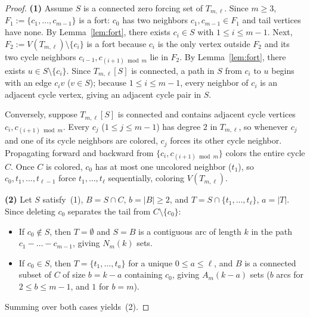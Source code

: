 \documentclass[11pt]{article}
\begin{document}
\begin{proof}
\textbf{(1)} Assume $S$ is a connected zero forcing set of $T_{m,\ell}$.
Since $m \ge 3$, $F_1 := \{c_1, \dots, c_{m-1}\}$ is a fort: $c_0$ has two
neighbors $c_1, c_{m-1} \in F_1$ and tail vertices have none. By
Lemma~\ref{lem:fort}, there exists $c_i \in S$ with $1 \le i \le m - 1$.
Next, $F_2 := V(T_{m,\ell}) \setminus \{c_i\}$ is a fort because $c_i$ is the
only vertex outside $F_2$ and its two cycle neighbors $c_{i-1}, c_{(i+1)\bmod m}$
lie in $F_2$. By Lemma~\ref{lem:fort}, there exists $u \in S \setminus \{c_i\}$.
Since $T_{m,\ell}[S]$ is connected, a path in $S$ from $c_i$ to $u$ begins with
an edge $c_i v$ ($v \in S$); because $1 \le i \le m - 1$, every neighbor of
$c_i$ is an adjacent cycle vertex, giving an adjacent cycle pair in $S$.

Conversely, suppose $T_{m,\ell}[S]$ is connected and contains adjacent cycle
vertices $c_i, c_{(i+1) \bmod m}$. Every $c_j$ ($1 \le j \le m - 1$) has degree
$2$ in $T_{m,\ell}$, so whenever $c_j$ and one of its cycle neighbors are
colored, $c_j$ forces its other cycle neighbor. Propagating forward and backward
from $\{c_i, c_{(i+1) \bmod m}\}$ colors the entire cycle $C$. Once $C$ is
colored, $c_0$ has at most one uncolored neighbor ($t_1$), so $c_0, t_1, \dots,
t_{\ell-1}$ force $t_1, \dots, t_\ell$ sequentially, coloring $V(T_{m,\ell})$.

\textbf{(2)} Let $S$ satisfy~(1), $B = S \cap C$, $b = |B| \ge 2$, and
$T = S \cap \{t_1, \dots, t_\ell\}$, $a = |T|$. Since deleting $c_0$ separates
the tail from $C \setminus \{c_0\}$:
\begin{itemize}
  \item If $c_0 \notin S$, then $T = \emptyset$ and $S = B$ is a contiguous arc
        of length $k$ in the path $c_1 - \dots - c_{m-1}$, giving $N_m(k)$ sets.
  \item If $c_0 \in S$, then $T = \{t_1, \dots, t_a\}$ for a unique
        $0 \le a \le \ell$, and $B$ is a connected subset of $C$ of size
        $b = k - a$ containing $c_0$, giving $A_m(k - a)$ sets ($b$ arcs for
        $2 \le b \le m - 1$, and $1$ for $b = m$).
\end{itemize}
Summing over both cases yields~(2).


\end{proof}
\end{document}
